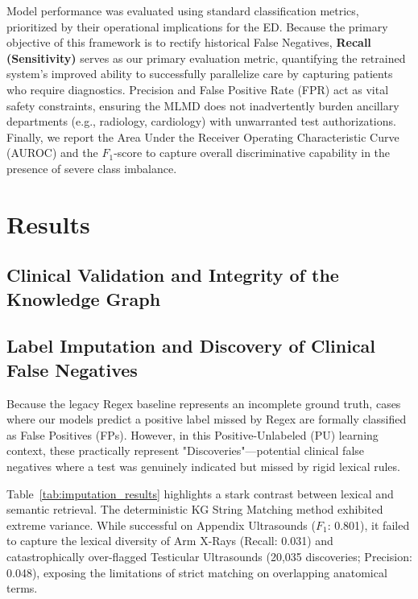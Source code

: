 \documentclass[pmlr]{jmlr}%
\begin{document}
Model performance was evaluated using standard classification metrics, prioritized by their operational implications for the ED. Because the primary objective of this framework is to rectify historical False Negatives, \textbf{Recall (Sensitivity)} serves as our primary evaluation metric, quantifying the retrained system's improved ability to successfully parallelize care by capturing patients who require diagnostics. Precision and False Positive Rate (FPR) act as vital safety constraints, ensuring the MLMD does not inadvertently burden ancillary departments (e.g., radiology, cardiology) with unwarranted test authorizations. Finally, we report the Area Under the Receiver Operating Characteristic Curve (AUROC) and the $F_1$-score to capture overall discriminative capability in the presence of severe class imbalance.

\section{Results}

\subsection{Clinical Validation and Integrity of the Knowledge Graph}

\subsection{Label Imputation and Discovery of Clinical False Negatives}

Because the legacy Regex baseline represents an incomplete ground truth, cases where our models predict a positive label missed by Regex are formally classified as False Positives (FPs). However, in this Positive-Unlabeled (PU) learning context, these practically represent "Discoveries"—potential clinical false negatives where a test was genuinely indicated but missed by rigid lexical rules.

Table~\ref{tab:imputation_results} highlights a stark contrast between lexical and semantic retrieval. The deterministic KG String Matching method exhibited extreme variance. While successful on Appendix Ultrasounds ($F_1$: 0.801), it failed to capture the lexical diversity of Arm X-Rays (Recall: 0.031) and catastrophically over-flagged Testicular Ultrasounds (20,035 discoveries; Precision: 0.048), exposing the limitations of strict matching on overlapping anatomical terms.
\end{document}
